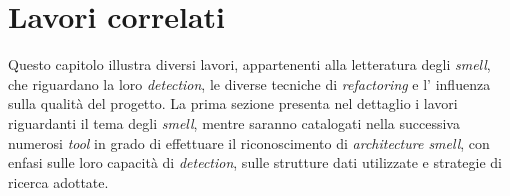 \section{Lavori correlati}


Questo capitolo illustra diversi lavori, appartenenti alla letteratura degli \textit{smell}, che riguardano la loro \textit{detection}, le diverse tecniche di \textit{refactoring} e l' influenza sulla qualità del progetto. La prima sezione presenta nel dettaglio i lavori riguardanti il tema degli \textit{smell}, mentre saranno catalogati nella successiva numerosi \textit{tool} in grado di effettuare il riconoscimento di \textit{architecture smell}, con enfasi sulle loro capacità di \textit{detection}, sulle strutture dati utilizzate e strategie di ricerca adottate.


\\





